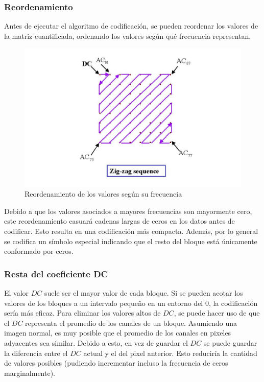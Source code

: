 \documentclass[%
	final,
	reprint,
	notitlepage,
	narroweqnarray,
	inline,
	twoside,
	invited
	]{ieee}
\begin{document}
\subsubsection{Reordenamiento}

\par Antes de ejecutar el algoritmo de codificación, se pueden reordenar los valores de la matriz cuantificada, 
ordenando los valores según qué frecuencia representan. 

\begin{figure}
	\includegraphics[scale=0.5]{./img/zig-zag.jpg}
	\caption{Reordenamiento de los valores según su frecuencia}
\label{zigzag}
\end{figure}

\par Debido a que los valores asociados a mayores frecuencias son mayormente cero, este reordenamiento casuará 
cadenas largas de ceros en los datos antes de codificar. Esto resulta en una codificación más compacta. Además, 
por lo general se codifica un símbolo especial indicando que el resto del bloque está únicamente conformado 
por ceros.

\subsubsection{Resta del coeficiente DC}

El valor $DC$ suele ser el mayor valor de cada bloque. Si se pueden acotar los valores de los bloques a un intervalo 
pequeño en un entorno del 0, la codificación sería más eficaz. Para eliminar los valores altos de $DC$, se puede hacer 
uso de que el $DC$ representa el promedio de los canales de un bloque. Asumiendo una imagen normal, es muy posible 
que el promedio de los canales en pixeles adyacentes sea similar. Debido a esto, en vez de guardar el $DC$ se puede 
guardar la diferencia entre el $DC$ actual y el del pixel anterior. Esto reduciría la cantidad de valores 
posibles (pudiendo incrementar incluso la frecuencia de ceros marginalmente).
\end{document}
